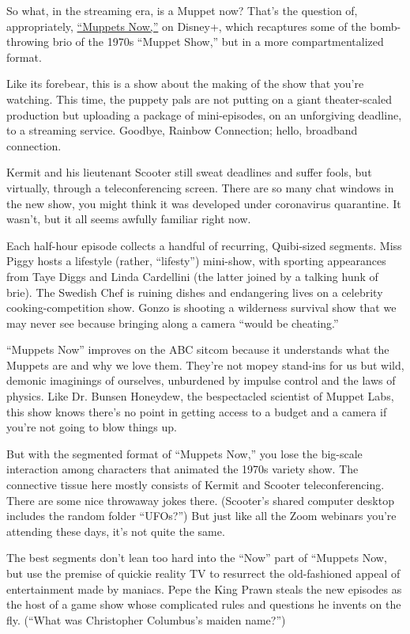 So what, in the streaming era, is a Muppet now? That's the question of,
appropriately,
\href{https://www.nytimes.com/2020/07/23/arts/television/muppets-now-disney.html}{``Muppets
Now,''} on Disney+, which recaptures some of the bomb-throwing brio of
the 1970s ``Muppet Show,'' but in a more compartmentalized format.

Like its forebear, this is a show about the making of the show that
you're watching. This time, the puppety pals are not putting on a giant
theater-scaled production but uploading a package of mini-episodes, on
an unforgiving deadline, to a streaming service. Goodbye, Rainbow
Connection; hello, broadband connection.

Kermit and his lieutenant Scooter still sweat deadlines and suffer
fools, but virtually, through a teleconferencing screen. There are so
many chat windows in the new show, you might think it was developed
under coronavirus quarantine. It wasn't, but it all seems awfully
familiar right now.

Each half-hour episode collects a handful of recurring, Quibi-sized
segments. Miss Piggy hosts a lifestyle (rather, ``lifesty'') mini-show,
with sporting appearances from Taye Diggs and Linda Cardellini (the
latter joined by a talking hunk of brie). The Swedish Chef is ruining
dishes and endangering lives on a celebrity cooking-competition show.
Gonzo is shooting a wilderness survival show that we may never see
because bringing along a camera ``would be cheating.''

``Muppets Now'' improves on the ABC sitcom because it understands what
the Muppets are and why we love them. They're not mopey stand-ins for us
but wild, demonic imaginings of ourselves, unburdened by impulse control
and the laws of physics. Like Dr. Bunsen Honeydew, the bespectacled
scientist of Muppet Labs, this show knows there's no point in getting
access to a budget and a camera if you're not going to blow things up.

But with the segmented format of ``Muppets Now,'' you lose the big-scale
interaction among characters that animated the 1970s variety show. The
connective tissue here mostly consists of Kermit and Scooter
teleconferencing. There are some nice throwaway jokes there. (Scooter's
shared computer desktop includes the random folder ``UFOs?'') But just
like all the Zoom webinars you're attending these days, it's not quite
the same.

The best segments don't lean too hard into the ``Now'' part of ``Muppets
Now, but use the premise of quickie reality TV to resurrect the
old-fashioned appeal of entertainment made by maniacs. Pepe the King
Prawn steals the new episodes as the host of a game show whose
complicated rules and questions he invents on the fly. (``What was
Christopher Columbus's maiden name?'')

